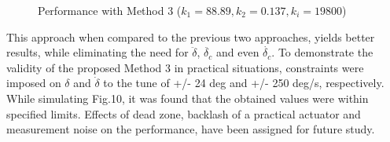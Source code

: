 \documentclass[conference]{IEEEtran}
\begin{document}
\begin{figure}[h]
\begin{center}
%
	\caption{Performance with Method 3 ($k_1= 88.89, k_2= 0.137, k_i= 19800$)}
\label{fig10}
\end{center}
\end{figure}
%
This approach when compared to the previous two approaches, yields better results, while eliminating the need for $\ddot{\delta}$, $\ddot{\delta_c}$ and even $\dot{\delta_c}$. To demonstrate the validity of the proposed Method 3 in practical situations, constraints were imposed on $\delta$ and $\dot{\delta}$ to the tune of +/- 24 deg and +/- 250 deg/s, respectively. While simulating Fig.10, it was found that the obtained values were within specified limits. Effects of dead zone, backlash of a practical actuator and measurement noise on the performance, have been assigned for future study.  
\end{document}
